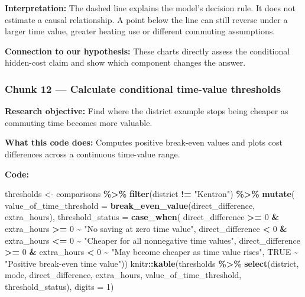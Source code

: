 \documentclass[
]{article}
\newenvironment{Shaded}{\begin{snugshade}}{\end{snugshade}}
\newcommand{\AttributeTok}[1]{\textcolor[rgb]{0.13,0.29,0.53}{#1}}
\newcommand{\ConstantTok}[1]{\textcolor[rgb]{0.56,0.35,0.01}{#1}}
\newcommand{\DecValTok}[1]{\textcolor[rgb]{0.00,0.00,0.81}{#1}}
\newcommand{\FunctionTok}[1]{\textcolor[rgb]{0.13,0.29,0.53}{\textbf{#1}}}
\newcommand{\NormalTok}[1]{#1}
\newcommand{\OtherTok}[1]{\textcolor[rgb]{0.56,0.35,0.01}{#1}}
\newcommand{\SpecialCharTok}[1]{\textcolor[rgb]{0.81,0.36,0.00}{\textbf{#1}}}
\newcommand{\StringTok}[1]{\textcolor[rgb]{0.31,0.60,0.02}{#1}}
\begin{document}
\textbf{Interpretation:} The dashed line explains the model's decision
rule. It does not estimate a causal relationship. A point below the line
can still reverse under a larger time value, greater heating use or
different commuting assumptions.

\textbf{Connection to our hypothesis:} These charts directly assess the
conditional hidden-cost claim and show which component changes the
answer.

\subsubsection{Chunk 12 --- Calculate conditional time-value
thresholds}\label{chunk-12-calculate-conditional-time-value-thresholds}

\textbf{Research objective:} Find where the district example stops being
cheaper as commuting time becomes more valuable.

\textbf{What this code does:} Computes positive break-even values and
plots cost differences across a continuous time-value range.

\textbf{Code:}

\begin{Shaded}
\begin{Highlighting}[]
\NormalTok{thresholds }\OtherTok{\textless{}{-}}\NormalTok{ comparisons }\SpecialCharTok{\%\textgreater{}\%} \FunctionTok{filter}\NormalTok{(district }\SpecialCharTok{!=} \StringTok{"Kentron"}\NormalTok{) }\SpecialCharTok{\%\textgreater{}\%} \FunctionTok{mutate}\NormalTok{(}
  \AttributeTok{value\_of\_time\_threshold =} \FunctionTok{break\_even\_value}\NormalTok{(direct\_difference, extra\_hours),}
  \AttributeTok{threshold\_status =} \FunctionTok{case\_when}\NormalTok{(}
\NormalTok{    direct\_difference }\SpecialCharTok{\textgreater{}=} \DecValTok{0} \SpecialCharTok{\&}\NormalTok{ extra\_hours }\SpecialCharTok{\textgreater{}=} \DecValTok{0} \SpecialCharTok{\textasciitilde{}} \StringTok{"No saving at zero time value"}\NormalTok{,}
\NormalTok{    direct\_difference }\SpecialCharTok{\textless{}} \DecValTok{0} \SpecialCharTok{\&}\NormalTok{ extra\_hours }\SpecialCharTok{\textless{}=} \DecValTok{0} \SpecialCharTok{\textasciitilde{}} \StringTok{"Cheaper for all nonnegative time values"}\NormalTok{,}
\NormalTok{    direct\_difference }\SpecialCharTok{\textgreater{}=} \DecValTok{0} \SpecialCharTok{\&}\NormalTok{ extra\_hours }\SpecialCharTok{\textless{}} \DecValTok{0} \SpecialCharTok{\textasciitilde{}} \StringTok{"May become cheaper as time value rises"}\NormalTok{,}
    \ConstantTok{TRUE} \SpecialCharTok{\textasciitilde{}} \StringTok{"Positive break{-}even time value"}\NormalTok{))}
\NormalTok{knitr}\SpecialCharTok{::}\FunctionTok{kable}\NormalTok{(thresholds }\SpecialCharTok{\%\textgreater{}\%} \FunctionTok{select}\NormalTok{(district, mode, direct\_difference, extra\_hours,}
\NormalTok{                                  value\_of\_time\_threshold, threshold\_status), }\AttributeTok{digits =} \DecValTok{1}\NormalTok{)}
\end{Highlighting}
\end{Shaded}
\end{document}
